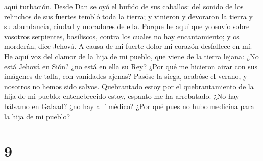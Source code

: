 aquí turbación.  Desde Dan se oyó el bufido de sus
caballos: del sonido de los relinchos de sus fuertes tembló toda la
tierra; y vinieron y devoraron la tierra y su abundancia, ciudad y
moradores de ella.  Porque he aquí que yo envío sobre
vosotros serpientes, basiliscos, contra los cuales no hay encantamiento;
y os morderán, dice Jehová.  A causa de mi fuerte dolor mi
corazón desfallece en mí.  He aquí voz del clamor de la
hija de mi pueblo, que viene de la tierra lejana: ¿No está Jehová en
Sión? ¿no está en ella su Rey? ¿Por qué me hicieron airar con sus
imágenes de talla, con vanidades ajenas?  Pasóse la siega,
acabóse el verano, y nosotros no hemos sido salvos. 
Quebrantado estoy por el quebrantamiento de la hija de mi pueblo;
entenebrecido estoy, espanto me ha arrebatado.  ¿No hay
bálsamo en Galaad? ¿no hay allí médico? ¿Por qué pues no hubo medicina
para la hija de mi pueblo?

\hypertarget{section-8}{%
\section{9}\label{section-8}}

